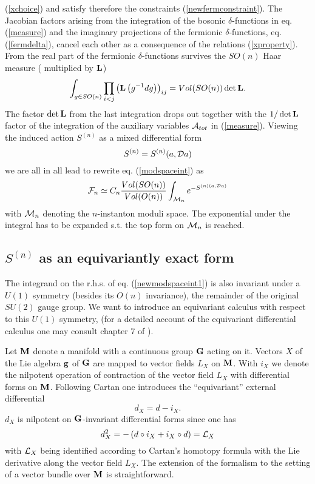 \documentclass[a4paper,12pt]{article}
\begin{document}
(\ref{xchoice}) and satisfy therefore the constraints 
(\ref{newfermconstraint}). The Jacobian factors arising from the 
integration of the bosonic $\delta$-functions in eq. (\ref{measure}) 
and the imaginary projections of the fermionic $\delta$-functions, eq. 
(\ref{fermdelta}), cancel each other as a consequence of the 
relations (\ref{xproperty}). From the real part of the fermionic 
$\delta$-functions survives the $SO(n)$ Haar measure (
multiplied by ${\bf L}$)
\[
\int_{g\in SO(n)}\prod_{i<j}\left({\bf L}\left(g^{-1}dg\right)\right)_{ij} 
=Vol(SO(n)) \det {\bf L}.
\]  
The factor $\det {\bf L}$ from the last integration drops out 
together with the $1/\det {\bf L}$ factor of the integration 
of the auxiliary variables ${\cal A}_{tot}$ in (\ref{measure}).
Viewing the induced action $S^{(n)}$ as a  mixed differential form 
\[ S^{(n)}=S^{(n)}(a,{\cal D}a) \]
we are all in all lead to rewrite eq. (\ref{modspaceint}) as 
\begin{equation}
{\cal F}_n\simeq C_n \frac{Vol(SO(n))}{Vol(O(n))}
\int_{{\cal M}_n} e^{-S^{(n)(a,{\cal D}a)}}
\label{newmodspaceint1}
\end{equation}         
with ${\cal M}_n$ denoting the $n$-instanton moduli space. The 
exponential under the integral has to be expanded s.t. the top 
form on ${\cal M}_n$ is reached. 
     
\subsection{$S^{(n)}$ as an equivariantly exact form}

The integrand on the r.h.s. of eq. (\ref{newmodspaceint1}) is also 
invariant under a $U(1)$ symmetry (besides its $O(n)$ invariance), 
the remainder of the original $SU(2)$ gauge group. We want to introduce 
an equivariant calculus with respect to this $U(1)$ symmetry, (for a 
detailed account of the equivariant differential calculus one may 
consult chapter 7 of \cite{berline}). 

Let ${\bf M}$ denote a manifold with a continuous group ${\bf G}$ 
acting on it. Vectors $X$ of the Lie algebra ${\bf g}$ of ${\bf G}$ 
are mapped to vector fields $L_X$ on ${\bf M}$. With $i_X$ we denote the 
nilpotent operation of contraction of the vector field $L_X$ with 
differential forms on  ${\bf M}$. Following Cartan \cite{cartan} 
one introduces the ``equivariant'' external differential 
\begin{equation}
d_X =d-i_X.
\label{equivdiff}
\end{equation}
$d_X$ is nilpotent on ${\bf G}$-invariant differential forms since 
one has 
\begin{equation}
d_X^2 =-\left(d \circ i_X + i_X \circ d \right)={\cal L}_X  
\end{equation}             
with ${\cal L}_X$ being identified according to Cartan's homotopy 
formula with the Lie derivative along the vector field $L_X$. The 
extension of the formalism to the setting of a vector bundle over 
${\bf M}$ is straightforward. 
\end{document}

